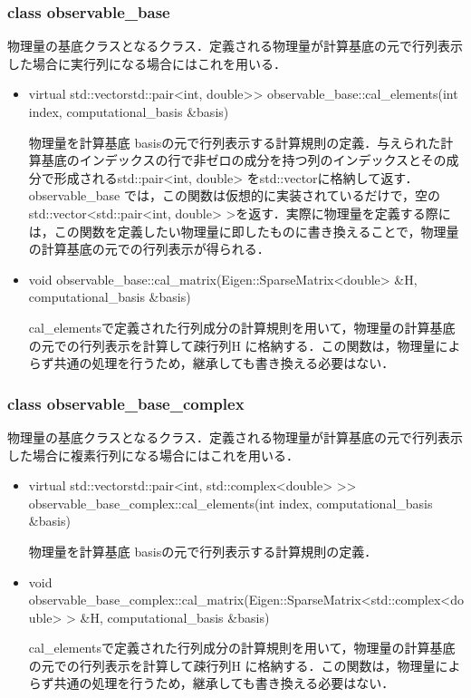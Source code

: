 \documentclass[report, 11pt, uplatex]{jsbook}
\begin{document}
	\subsubsection*{class observable\_base}
	物理量の基底クラスとなるクラス．定義される物理量が計算基底の元で行列表示した場合に実行列になる場合にはこれを用いる．
	
	\begin{itemize}
		\item virtual std::vectorstd::pair<int, double>> observable\_base::cal\_elements(int index, computational\_basis \&basis)
		
		物理量を計算基底 basisの元で行列表示する計算規則の定義．与えられた計算基底のインデックスの行で非ゼロの成分を持つ列のインデックスとその成分で形成されるstd::pair<int, double> をstd::vectorに格納して返す．observable\_base では，この関数は仮想的に実装されているだけで，空のstd::vector<std::pair<int, double> >を返す．実際に物理量を定義する際には，この関数を定義したい物理量に即したものに書き換えることで，物理量の計算基底の元での行列表示が得られる．
		
		\item void observable\_base::cal\_matrix(Eigen::SparseMatrix<double> \&H, computational\_basis \&basis)
		
		cal\_elementsで定義された行列成分の計算規則を用いて，物理量の計算基底の元での行列表示を計算して疎行列H に格納する．この関数は，物理量によらず共通の処理を行うため，継承しても書き換える必要はない．
		
	\end{itemize}
	
	\subsubsection*{class observable\_base\_complex}
	物理量の基底クラスとなるクラス．定義される物理量が計算基底の元で行列表示した場合に複素行列になる場合にはこれを用いる．
	
	\begin{itemize}
		\item virtual std::vectorstd::pair<int, std::complex<double> >> observable\_base\_complex::cal\_elements(int index, computational\_basis \&basis)
		
		物理量を計算基底 basisの元で行列表示する計算規則の定義．
		
		\item void observable\_base\_complex::cal\_matrix(Eigen::SparseMatrix<std::complex<double> > \&H, computational\_basis \&basis)
		
		cal\_elementsで定義された行列成分の計算規則を用いて，物理量の計算基底の元での行列表示を計算して疎行列H に格納する．この関数は，物理量によらず共通の処理を行うため，継承しても書き換える必要はない．
		
	\end{itemize}
\end{document}
